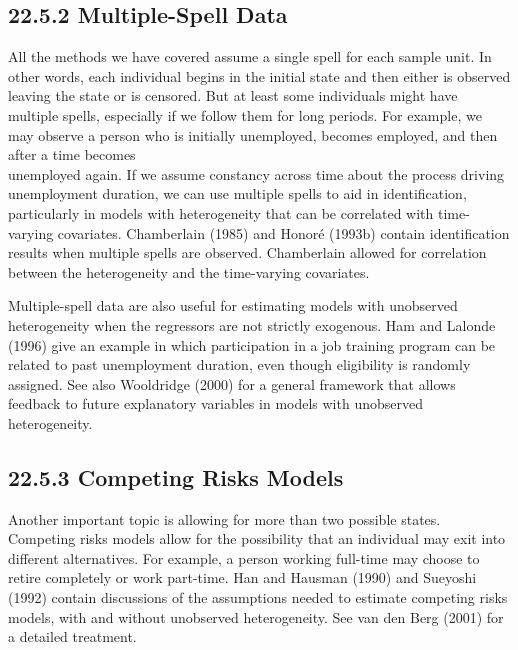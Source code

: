 \documentclass[10pt]{article}
\begin{document}
\subsection*{22.5.2 Multiple-Spell Data}
All the methods we have covered assume a single spell for each sample unit. In other words, each individual begins in the initial state and then either is observed leaving the state or is censored. But at least some individuals might have multiple spells, especially if we follow them for long periods. For example, we may observe a person who is initially unemployed, becomes employed, and then after a time becomes\\
unemployed again. If we assume constancy across time about the process driving unemployment duration, we can use multiple spells to aid in identification, particularly in models with heterogeneity that can be correlated with time-varying covariates. Chamberlain (1985) and Honoré (1993b) contain identification results when multiple spells are observed. Chamberlain allowed for correlation between the heterogeneity and the time-varying covariates.

Multiple-spell data are also useful for estimating models with unobserved heterogeneity when the regressors are not strictly exogenous. Ham and Lalonde (1996) give an example in which participation in a job training program can be related to past unemployment duration, even though eligibility is randomly assigned. See also Wooldridge (2000) for a general framework that allows feedback to future explanatory variables in models with unobserved heterogeneity.

\subsection*{22.5.3 Competing Risks Models}
Another important topic is allowing for more than two possible states. Competing risks models allow for the possibility that an individual may exit into different alternatives. For example, a person working full-time may choose to retire completely or work part-time. Han and Hausman (1990) and Sueyoshi (1992) contain discussions of the assumptions needed to estimate competing risks models, with and without unobserved heterogeneity. See van den Berg (2001) for a detailed treatment.
\end{document}
